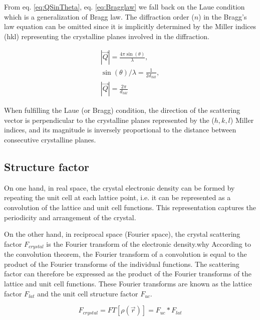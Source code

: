 From eq. \ref{eq:QSinTheta}, eq. \ref{eq:Bragglaw} we fall back on the Laue condition which is a generalization of Bragg law. The diffraction order ($n$) in the Bragg's law equation can be omitted since it is implicitly determined by the Miller indices (hkl) representing the crystalline planes involved in the diffraction.

\begin{gather}
    \label{eq:QandD}
    |\vec{Q}| = \frac{4\pi \sin(\theta)}{\lambda},\\
    \sin(\theta) / \lambda = \frac{1}{2d_{hkl}},\\
    |\vec{Q}| = \frac{2\pi}{d_{hkl}}
\end{gather}{}

When fulfilling the Laue (or Bragg) condition, the direction of the scattering vector is perpendicular to the crystalline planes represented by the ($h, k, l$) Miller indices, and its magnitude is inversely proportional to the distance between consecutive crystalline planes.

\subsection{Structure factor}

On one hand, in real space, the crystal electronic density can be formed by repeating the unit cell at each lattice point, i.e. it can be represented as a convolution of the lattice and unit cell functions.
This representation captures the periodicity and arrangement of the crystal.

On the other hand, in reciprocal space (Fourier space), the crystal scattering factor $F_{crystal}$ is the Fourier transform of the electronic density.\textcolor{Important}{why}
According to the convolution theorem, the Fourier transform of a convolution is equal to the product of the Fourier transforms of the individual functions.
The scattering factor can therefore be expressed as the product of the Fourier transforms of the lattice and unit cell functions.
These Fourier transforms are known as the lattice factor $F_{lat}$ and the unit cell structure factor $F_{uc}$.

\begin{equation}
    F_{crystal} = FT[\rho(\vec{r})] = F_{uc} * F_{lat}
    \label{eq:FcrystalFlatFuc}
\end{equation}

